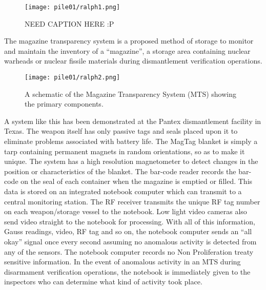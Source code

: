 \documentclass[twoside,titlepage,11pt,twocolumn,a4paper]{article}
\begin{document}
\begin{figure}
  \texttt{[image: pile01/ralph1.png]}
	\caption{NEED CAPTION HERE :P \citep{dismantleBBC2009}}
\end{figure}

The magazine transparency system is a proposed method of storage to
monitor and maintain the inventory of a ``magazine'', a storage area
containing nuclear warheads or nuclear fissile materials during
dismantlement verification operations.

\begin{figure}
  \texttt{[image: pile01/ralph2.png]}
  \caption{A schematic of the Magazine Transparency System (MTS) 
    showing the primary components. \citep{gerdes2001}}
\end{figure}

A system like this has been demonstrated at the Pantex dismantlement
facility in Texas. The weapon itself has only passive tags and seals
placed upon it to eliminate problems associated with battery life. The
MagTag blanket is simply a tarp containing permanent magnets in random
orientations, so as to make it unique. The system has a high
resolution magnetometer to detect changes in the position or
characteristics of the blanket. The bar-code reader records the
bar-code on the seal of each container when the magazine is emptied or
filled. This data is stored on an integrated notebook computer which
can transmit to a central monitoring station. The RF receiver
transmits the unique RF tag number on each weapon/storage vessel to
the notebook. Low light video cameras also send video straight to the
notebook for processing. With all of this information, Gauss readings,
video, RF tag and so on, the notebook computer sends an ``all okay''
signal once every second assuming no anomalous activity is detected
from any of the sensors. The notebook computer records no Non
Proliferation treaty sensitive information.  In the event of anomalous
activity in an MTS during disarmament verification operations, the
notebook is immediately given to the inspectors who can determine what
kind of activity took place. \citep{gerdes2001}
\end{document}
